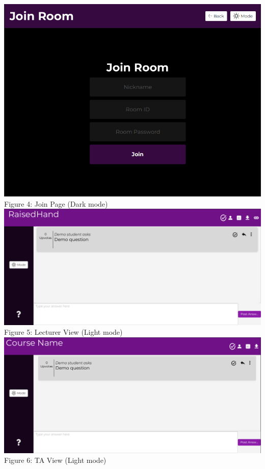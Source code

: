 \documentclass{article}
\begin{document}
\begin{appendices}
        \includegraphics[scale=0.6]{Join.png}\\
        Figure 4: Join Page (Dark mode)\\
        \includegraphics[scale=0.5]{Lecturer_view.png}\\
        Figure 5: Lecturer View (Light mode)\\
        \includegraphics[scale=0.5]{TA_View.png}\\
        Figure 6: TA View (Light mode)\\

\end{appendices}
\end{document}

